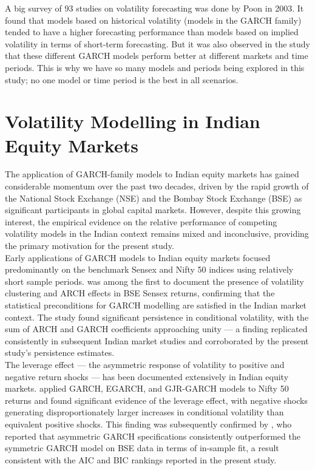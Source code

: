 A big survey of 93 studies on volatility forecasting was done by Poon in 2003. It found that models based on historical volatility (models in the GARCH family) tended to have a higher forecasting performance than models based on implied volatility in terms of short-term forecasting. But it was also observed in the study that these different GARCH models perform better at different markets and time periods. This is why we have so many models and periods being explored in this study; no one model or time period is the best in all scenarios.


\section{Volatility Modelling in Indian Equity Markets}
The application of GARCH-family models to Indian equity markets has gained considerable momentum over the past two decades, driven by the rapid growth of the National Stock Exchange (NSE) and the Bombay Stock Exchange (BSE) as significant participants in global capital markets. However, despite this growing interest, the empirical evidence on the relative performance of competing volatility models in the Indian context remains mixed and inconclusive, providing the primary motivation for the present study.\\
Early applications of GARCH models to Indian equity markets focused predominantly on the benchmark Sensex and Nifty 50 indices using relatively short sample periods. \cite{kaur2004} was among the first to document the presence of volatility clustering and ARCH effects in BSE Sensex returns, confirming that the statistical preconditions for GARCH modelling are satisfied in the Indian market context. The study found significant persistence in conditional volatility, with the sum of ARCH and GARCH coefficients approaching unity — a finding replicated consistently in subsequent Indian market studies and corroborated by the present study's persistence estimates.\\
The leverage effect — the asymmetric response of volatility to positive and negative return shocks — has been documented extensively in Indian equity markets. \cite{pandey2005} applied GARCH, EGARCH, and GJR-GARCH models to Nifty 50 returns and found significant evidence of the leverage effect, with negative shocks generating disproportionately larger increases in conditional volatility than equivalent positive shocks. This finding was subsequently confirmed by \cite{banerjee2006}, who reported that asymmetric GARCH specifications consistently outperformed the symmetric GARCH model on BSE data in terms of in-sample fit, a result consistent with the AIC and BIC rankings reported in the present study.\\
